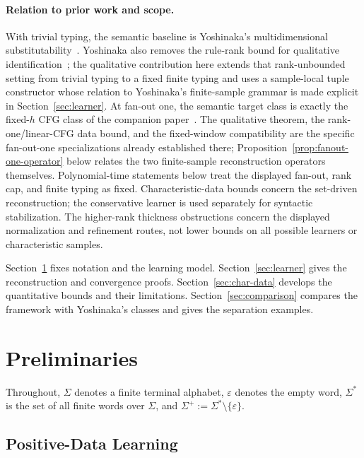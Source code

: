 \documentclass[11pt]{article}
\numberwithin{equation}{section}
\theoremstyle{plain}
\theoremstyle{definition}
\theoremstyle{remark}
\newcommand{\eps}{\varepsilon}
\begin{document}
\paragraph{Relation to prior work and scope.}
With trivial typing, the semantic baseline is Yoshinaka's multidimensional
substitutability~\cite{Yoshinaka2011}.  Yoshinaka also removes the rule-rank
bound for qualitative identification~\cite[Corollary~2]{Yoshinaka2011}; the
qualitative contribution here extends that rank-unbounded setting from trivial
typing to a fixed finite typing and uses a sample-local tuple constructor whose
relation to Yoshinaka's finite-sample grammar is made explicit in
Section~\ref{sec:learner}.  At fan-out one, the semantic target class is exactly
the fixed-$h$ CFG class of the companion paper~\cite{kuriyamaCFG}.  The
qualitative theorem, the rank-one/linear-CFG data bound, and the fixed-window
compatibility are the specific fan-out-one specializations already established
there; Proposition~\ref{prop:fanout-one-operator} below relates the two
finite-sample reconstruction operators themselves.  Polynomial-time statements
below treat the displayed fan-out, rank cap, and finite typing as fixed.
Characteristic-data bounds concern the set-driven reconstruction; the
conservative learner is used separately for syntactic stabilization.  The
higher-rank thickness obstructions concern the displayed normalization and
refinement routes, not lower bounds on all possible learners or characteristic
samples.

Section~\ref{sec:prelim} fixes notation and the learning model.
Section~\ref{sec:learner} gives the reconstruction and convergence proofs.
Section~\ref{sec:char-data} develops the quantitative bounds and their
limitations.  Section~\ref{sec:comparison} compares the framework with
Yoshinaka's classes and gives the separation examples.

\section{Preliminaries}
\label{sec:prelim}

Throughout, $\Sigma$ denotes a finite terminal alphabet, $\eps$ denotes the
empty word, $\Sigma^*$ is the set of all finite words over $\Sigma$, and
$\Sigma^+:=\Sigma^*\setminus\{\eps\}$.

\subsection{Positive-Data Learning}
\end{document}
